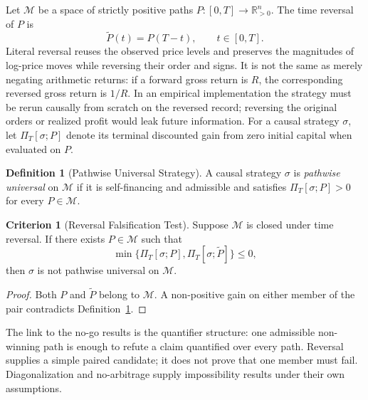 \documentclass[aps,pra,reprint,superscriptaddress,amsmath,amssymb,floatfix]{revtex4-2}
\theoremstyle{plain}
\theoremstyle{definition}
\newtheorem{definition}{Definition}
\newtheorem{criterion}{Criterion}
\theoremstyle{remark}
\begin{document}
Let \(\mathcal{M}\) be a space of strictly positive paths
\(P\colon[0,T]\to\mathbb{R}_{>0}^n\). The time reversal of \(P\) is
\begin{equation}
  \widetilde{P}(t)=P(T-t), \qquad t\in[0,T].
  \label{eq:timereversal}
\end{equation}
Literal reversal reuses the observed price levels and preserves the magnitudes
of log-price moves while reversing their order and signs. It is not the same
as merely negating arithmetic returns: if a forward gross return is \(R\), the
corresponding reversed gross return is \(1/R\). In an empirical implementation
the strategy must be rerun causally from scratch on the reversed record;
reversing the original orders or realized profit would leak future information.
For a causal strategy \(\sigma\), let \(\Pi_T[\sigma;P]\) denote its terminal
discounted gain from zero initial capital when evaluated on \(P\).

\begin{definition}[Pathwise Universal Strategy]
\label{def:universal}
  A causal strategy \(\sigma\) is \emph{pathwise universal} on
  \(\mathcal{M}\) if it is self-financing and admissible and satisfies
  \(\Pi_T[\sigma;P]>0\) for every \(P\in\mathcal{M}\).
\end{definition}

\begin{criterion}[Reversal Falsification Test]
  \label{crit:tr}
  Suppose \(\mathcal{M}\) is closed under time reversal. If there exists
  \(P\in\mathcal{M}\) such that
  \begin{equation}
    \min\{\Pi_T[\sigma;P],\Pi_T[\sigma;\widetilde P]\}\leq 0,
    \label{eq:reversaltest}
  \end{equation}
  then \(\sigma\) is not pathwise universal on \(\mathcal{M}\).
\end{criterion}

\begin{proof}
Both \(P\) and \(\widetilde P\) belong to \(\mathcal{M}\). A non-positive gain
on either member of the pair contradicts Definition~\ref{def:universal}.
\end{proof}

The link to the no-go results is the quantifier structure: one admissible
non-winning path is enough to refute a claim quantified over every path.
Reversal supplies a simple paired candidate; it does not prove that one member
must fail. Diagonalization and no-arbitrage supply impossibility results under
their own assumptions.
\end{document}
